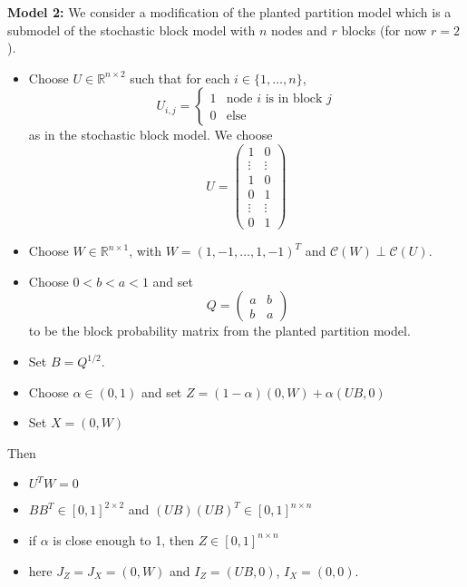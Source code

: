 \documentclass[notheorems]{beamer}
\theoremstyle{definition}
\newcommand{\al}{\alpha}
\newcommand{\R}{\mathbb{R}}
\newcommand{\MC}{\mathcal{C}}
\begin{document}
\begin{frame}
\textbf{Model 2:}
We consider a modification of the planted partition model which is a submodel of the stochastic block model with $n$ nodes and $r$ blocks (for now $r=2$).
\begin{itemize}
    \item Choose $U \in \R^{n \times 2}$ such that for each $i \in \{1, \ldots, n\}$, 
    \[
    U_{i,j} = 
    \begin{cases}
    1 & \text{node $i$ is in block $j$} \\
    0 & \text{else}
    \end{cases}
    \] 
    as in the stochastic block model. We choose
    \[
    U = 
    \begin{pmatrix}
    1 & 0 \\
    \vdots & \vdots \\
    1 & 0 \\
    0 & 1 \\
    \vdots & \vdots \\
    0 & 1
    \end{pmatrix}
    \]
\end{itemize}
\end{frame}

\begin{frame}
\begin{itemize}
\item Choose $W \in \R^{n \times 1}$, with $W = (1, -1, \ldots, 1, -1)^T$ and $\MC(W) \perp \MC(U)$. 
    \item Choose $0<b<a<1$ and set
    \[\
    Q = 
    \begin{pmatrix}
    a & b \\
    b & a
    \end{pmatrix}
    \]
    to be the block probability matrix from the planted partition model.
    \item Set $B = Q^{1/2}$.
    \item Choose $\al \in (0,1)$ and set $Z = (1-\al) (0,W) + \al (UB, 0)$
    \item Set $X = (0,W)$
\end{itemize}
\end{frame}

\begin{frame}
Then
\begin{itemize}
    \item $U^TW = 0$
    \item $BB^T \in [0,1]^{2 \times 2}$ and $(UB)(UB)^T \in [0,1]^{n \times n}$
    \item if $\al$ is close enough to 1, then $Z \in  [0,1]^{n \times n}$
    \item here $J_Z = J_X = (0, W)$ and $I_Z = (UB, 0)$, $I_X = (0,0)$.
\end{itemize}
\end{frame}
\end{document}
